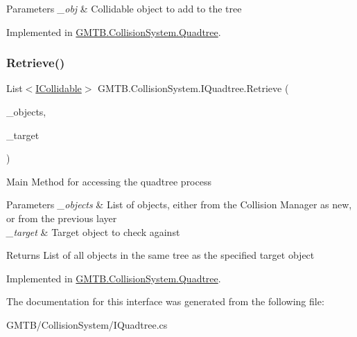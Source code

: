 \begin{DoxyParams}{Parameters}
{\em \+\_\+obj} & Collidable object to add to the tree \\
\hline
\end{DoxyParams}


Implemented in \mbox{\hyperlink{class_g_m_t_b_1_1_collision_system_1_1_quadtree_a31faf1269f7048a71c59db80f8e6c375}{G\+M\+T\+B.\+Collision\+System.\+Quadtree}}.

\mbox{\label{interface_g_m_t_b_1_1_collision_system_1_1_i_quadtree_a1d7564249805855fa89288bde1a673a9}} 
\subsubsection{\texorpdfstring{Retrieve()}{Retrieve()}}
{\footnotesize\ttfamily List$<$\mbox{\hyperlink{interface_g_m_t_b_1_1_collision_system_1_1_i_collidable}{I\+Collidable}}$>$ G\+M\+T\+B.\+Collision\+System.\+I\+Quadtree.\+Retrieve (\begin{DoxyParamCaption}\item[{List$<$ \mbox{\hyperlink{interface_g_m_t_b_1_1_collision_system_1_1_i_collidable}{I\+Collidable}} $>$}]{\+\_\+objects,  }\item[{\mbox{\hyperlink{interface_g_m_t_b_1_1_collision_system_1_1_i_collidable}{I\+Collidable}}}]{\+\_\+target }\end{DoxyParamCaption})}



Main Method for accessing the quadtree process 


\begin{DoxyParams}{Parameters}
{\em \+\_\+objects} & List of objects, either from the Collision Manager as new, or from the previous layer \\
\hline
{\em \+\_\+target} & Target object to check against \\
\hline
\end{DoxyParams}
\begin{DoxyReturn}{Returns}
List of all objects in the same tree as the specified target object 
\end{DoxyReturn}


Implemented in \mbox{\hyperlink{class_g_m_t_b_1_1_collision_system_1_1_quadtree_aefeacbfba0320ea7e23c15658179c2c6}{G\+M\+T\+B.\+Collision\+System.\+Quadtree}}.



The documentation for this interface was generated from the following file\+:\begin{DoxyCompactItemize}
\item 
G\+M\+T\+B/\+Collision\+System/I\+Quadtree.\+cs\end{DoxyCompactItemize}
